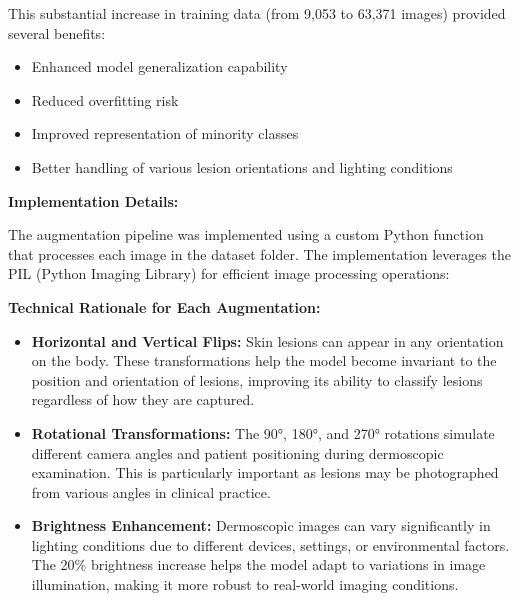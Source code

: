 \documentclass[a4paper,12pt]{report}
\begin{document}
\begin{spacing}{1.5}
    This substantial increase in training data (from 9,053 to 63,371 images) provided several benefits:
    \begin{itemize}
        \item Enhanced model generalization capability
        \item Reduced overfitting risk
        \item Improved representation of minority classes
        \item Better handling of various lesion orientations and lighting conditions
    \end{itemize}
    
    \textbf{Implementation Details:}
    
    The augmentation pipeline was implemented using a custom Python function that processes each image in the dataset folder. The implementation leverages the PIL (Python Imaging Library) for efficient image processing operations:
    
    \newpage
    
    
    \textbf{Technical Rationale for Each Augmentation:}
    \begin{itemize}
        \item \textbf{Horizontal and Vertical Flips:} Skin lesions can appear in any orientation on the body. These transformations help the model become invariant to the position and orientation of lesions, improving its ability to classify lesions regardless of how they are captured.
        
        \item \textbf{Rotational Transformations:} The 90°, 180°, and 270° rotations simulate different camera angles and patient positioning during dermoscopic examination. This is particularly important as lesions may be photographed from various angles in clinical practice.
        
        \item \textbf{Brightness Enhancement:} Dermoscopic images can vary significantly in lighting conditions due to different devices, settings, or environmental factors. The 20\% brightness increase helps the model adapt to variations in image illumination, making it more robust to real-world imaging conditions.
    \end{itemize}
    

\end{spacing}
\end{document}
